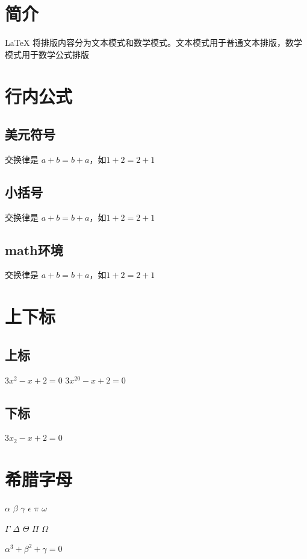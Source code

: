 \documentclass{ctexart}
\begin{document}

    \section{简介}
    \LaTeX{} 将排版内容分为文本模式和数学模式。文本模式用于普通文本排版，数学模式用于数学公式排版
    \section{行内公式}
    \subsection{美元符号}
    交换律是 $a+b=b+a$，如$1+2=2+1$
    \subsection{小括号}
    交换律是 \(a+b=b+a\)，如\(1+2=2+1\)
    \subsection{math环境}
    交换律是 \begin{math}a+b=b+a\end{math}，如\begin{math}1+2=2+1\end{math}

    \section{上下标}
    \subsection{上标}
    $3x^2 - x + 2 = 0$
    $3x^{20} - x + 2 = 0$
    \subsection{下标}
    $3x_2 - x + 2 = 0$

    \section{希腊字母}
    $\alpha$
    $\beta$
    $\gamma$
    $\epsilon$
    $\pi$
    $\omega$

    $\Gamma$
    $\Delta$
    $\Theta$
    $\Pi$
    $\Omega$

    $\alpha^3 + \beta^2 + \gamma = 0$
\end{document}
